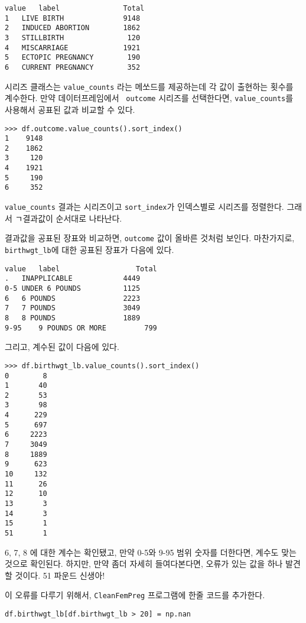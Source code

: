 \begin{verbatim}
value	label	 	        Total
1	LIVE BIRTH              9148
2	INDUCED ABORTION        1862
3	STILLBIRTH               120
4	MISCARRIAGE             1921
5	ECTOPIC PREGNANCY        190
6	CURRENT PREGNANCY        352
\end{verbatim}

시리즈 클래스는 \verb"value_counts" 라는 메쏘드를 제공하는데 각 값이 출현하는 횟수를 계수한다. 만약 데이터프레임에서 {\tt
  outcome} 시리즈를 선택한다면, \verb"value_counts"를 사용해서 공표된 값과 비교할 수 있다. 


\begin{verbatim}
>>> df.outcome.value_counts().sort_index()
1    9148
2    1862
3     120
4    1921
5     190
6     352
\end{verbatim}

\verb"value_counts" 결과는 시리즈이고 \verb"sort_index"가 인덱스별로 시리즈를 정렬한다. 그래서 ㄱ결과값이 순서대로 나타난다.

결과값을 공표된 장표와 비교하면, {\tt outcome} 값이 올바른 것처럼 보인다. 마찬가지로, \verb"birthwgt_lb"에 대한 공표된 장표가 다음에 있다.

\begin{verbatim}
value	label                  Total
.	INAPPLICABLE            4449
0-5	UNDER 6 POUNDS          1125
6	6 POUNDS                2223
7	7 POUNDS                3049
8	8 POUNDS                1889
9-95	9 POUNDS OR MORE         799
\end{verbatim}

그리고, 계수된 값이 다음에 있다.

\begin{verbatim}
>>> df.birthwgt_lb.value_counts().sort_index()
0        8
1       40
2       53
3       98
4      229
5      697
6     2223
7     3049
8     1889
9      623
10     132
11      26
12      10
13       3
14       3
15       1
51       1
\end{verbatim}

6, 7, 8 에 대한 계수는 확인됐고, 만약 0-5와 9-95 범위 숫자를 더한다면, 계수도 맞는 것으로 확인된다. 하지만, 만약 좀더 자세히 들여다본다면, 오류가 있는 값을 하나 발견할 것이다. 51 파운드 신생아!

이 오류를 다루기 위해서, {\tt CleanFemPreg} 프로그램에 한줄 코드를 추가한다.

\begin{verbatim}
df.birthwgt_lb[df.birthwgt_lb > 20] = np.nan
\end{verbatim}

